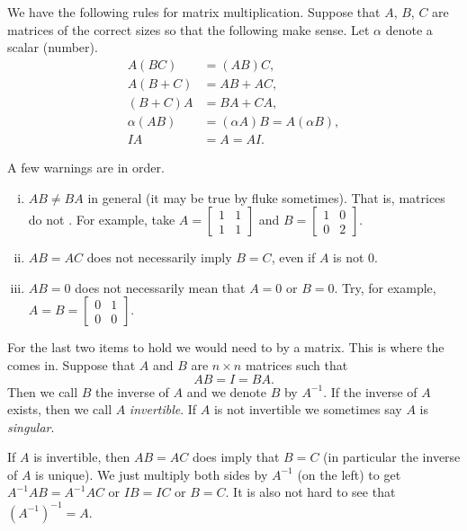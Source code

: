 We have the following rules for matrix multiplication.  Suppose that
$A$, $B$, $C$ are matrices of the correct sizes so that the following
make sense.  Let $\alpha$ denote a scalar (number).
\begin{align*}
A(BC) & = (AB)C, \\
A(B+C) & = AB + AC, \\
(B+C)A & = BA + CA, \\
\alpha(AB) & = (\alpha A)B = A(\alpha B), \\
IA & = A = AI .
\end{align*}

\pagebreak[2]
A few warnings are in order.
\begin{enumerate}[(i)]
\item $AB \not= BA$ in general (it may be true by fluke sometimes).  That is,
matrices do not .
For example, take
$A = \left[ \begin{smallmatrix} 1 & 1 \\ 1 & 1 \end{smallmatrix} \right]$
and
$B = \left[ \begin{smallmatrix} 1 & 0 \\ 0 & 2 \end{smallmatrix} \right]$.
\item $AB = AC$ does not necessarily imply $B=C$, even if $A$ is not 0.
\item $AB = 0$ does not necessarily mean that $A=0$ or $B=0$.
Try, for example,
$A = B = \left[ \begin{smallmatrix} 0 & 1 \\ 0 & 0 \end{smallmatrix}
\right]$.
\end{enumerate}

For the last two items to hold we would need to  by
a matrix.  This is where the \emph{} comes in.
Suppose that $A$ and $B$ are $n \times n$ matrices such that
\begin{equation*}
AB = I = BA .
\end{equation*}
Then we call $B$ the inverse of $A$ and we denote $B$ by $A^{-1}$.
If the inverse of $A$ exists, then we call $A$
\emph{invertible}.
If $A$ is not invertible we sometimes say $A$ is
\emph{singular}.

If $A$ is invertible, then $AB = AC$ does imply
that $B = C$ (in particular the inverse of $A$ is unique).
We just multiply both sides by $A^{-1}$ (on the left) to get
$A^{-1}AB = A^{-1}AC$ or $IB=IC$ or $B=C$.
It is also not hard to see that ${(A^{-1})}^{-1} = A$.

